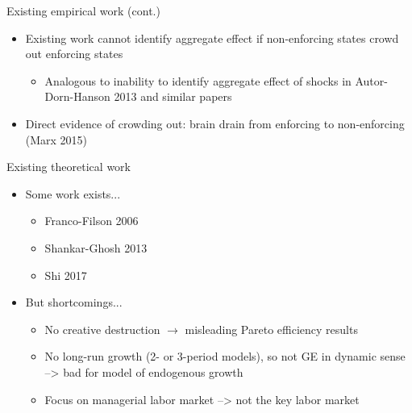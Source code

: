 \documentclass[english,usenames,dvipsnames]{beamer}
\begin{document}
\begin{frame}{Existing empirical work (cont.)}
\begin{itemize}	
	\item Existing work cannot identify aggregate effect if non-enforcing states crowd out enforcing states
	\begin{itemize}
		\item Analogous to inability to identify aggregate effect of shocks in Autor-Dorn-Hanson 2013 and similar papers	
	\end{itemize}
	\item Direct evidence of crowding out: brain drain from enforcing to non-enforcing (Marx 2015)	
\end{itemize}
\end{frame}

\begin{frame}{Existing theoretical work}
\begin{itemize}
	\item Some work exists...
	\begin{itemize}
		\item Franco-Filson 2006 
		\item Shankar-Ghosh 2013
		\item Shi 2017
	\end{itemize}
	\item But shortcomings...
	\begin{itemize}
		\item No creative destruction $\rightarrow$ misleading Pareto efficiency results	
		\item No long-run growth (2- or 3-period models), so not GE in dynamic sense --> bad for model of endogenous growth
		\item Focus on managerial labor market --> not the key labor market 
	\end{itemize}
\end{itemize}
\end{frame}
\end{document}
